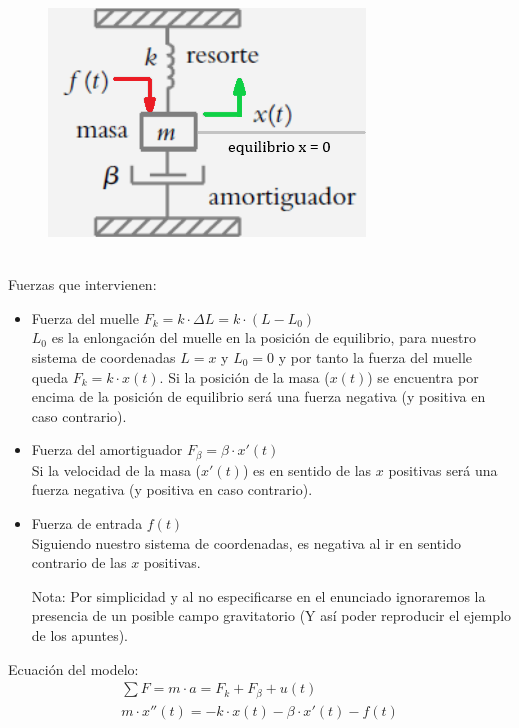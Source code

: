 \documentclass{article}
\begin{document}
\begin{figure}[h]
    \includegraphics[scale=0.5]{masa-muelle-resorte-ejes.png}
    \centering
\end{figure}
\\
Fuerzas que intervienen:
\begin{itemize}
    \item Fuerza del muelle
    \subitem \(F_k = k \cdot \Delta L = k \cdot (L-L_0)\) \\
    \(L_0\) es la enlongación del muelle en la posición de equilibrio, para nuestro sistema de coordenadas \(L = x\) y \(L_0 = 0\) y por tanto la fuerza del muelle queda \(F_k = k \cdot x(t)\). Si la posición de la masa (\(x(t)\)) se encuentra por encima de la posición de equilibrio será una fuerza negativa (y positiva en caso contrario).

    \item Fuerza del amortiguador
    \subitem \(F_\beta = \beta \cdot x'(t)\) \\
    Si la velocidad de la masa (\(x'(t)\)) es en sentido de las \(x\) positivas será una fuerza negativa (y positiva en caso contrario).

    \item Fuerza de entrada
    \subitem \(f(t)\) \\
    Siguiendo nuestro sistema de coordenadas, es negativa al ir en sentido contrario de las \(x\) positivas.

    \item[Nota:] Por simplicidad y al no especificarse en el enunciado ignoraremos la presencia de un posible campo gravitatorio (Y así poder reproducir el ejemplo de los apuntes). 
\end{itemize}
Ecuación del modelo:
\begin{align*}
    \sum F 
    = 
    m \cdot a
    = F_k + F_\beta + u(t) \\
    m \cdot x''(t)
    = 
    - k \cdot x(t)
    - \beta \cdot x'(t)
    - f(t)
\end{align*}
\end{document}
